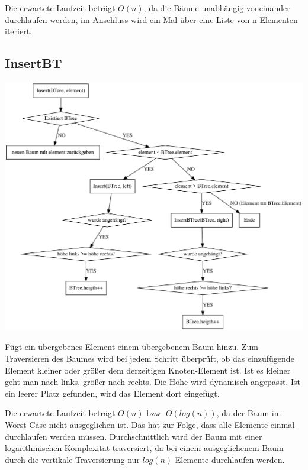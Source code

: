 \documentclass[11pt]{article}
\begin{document}
    Die erwartete Laufzeit beträgt
    \begin{math}
        O(n)
    \end{math},
    da die Bäume unabhängig voneinander durchlaufen werden, im Anschluss wird
    ein Mal über eine Liste von n Elementen iteriert.

    \subsection{InsertBT}\label{subsec:insertbt}

    \begin{center}
        \includegraphics[width=1\columnwidth] {insert}
    \end{center}

    Fügt ein übergebenes Element einem übergebenem Baum hinzu.
    Zum Traversieren des Baumes wird bei jedem Schritt überprüft,
    ob das einzufügende Element kleiner oder größer dem derzeitigen Knoten-Element ist.
    Ist es kleiner geht man nach links, größer nach rechts.
    Die Höhe wird dynamisch angepasst.
    Ist ein leerer Platz gefunden,
    wird das Element dort eingefügt.

    Die erwartete Laufzeit beträgt
    \begin{math}
        O(n)
    \end {math}
    bzw.
    \begin{math}
        \Theta (log (n))
    \end{math},
    da der Baum im Worst-Case nicht ausgeglichen ist.
    Das hat zur Folge, dass alle Elemente einmal durchlaufen werden müssen.
    Durchschnittlich wird der Baum mit einer logarithmischen Komplexität
    traversiert, da bei einem ausgeglichenem Baum durch die vertikale
    Traversierung nur
    \begin{math}
        log (n)
    \end{math}
    Elemente durchlaufen werden.
\end{document}

